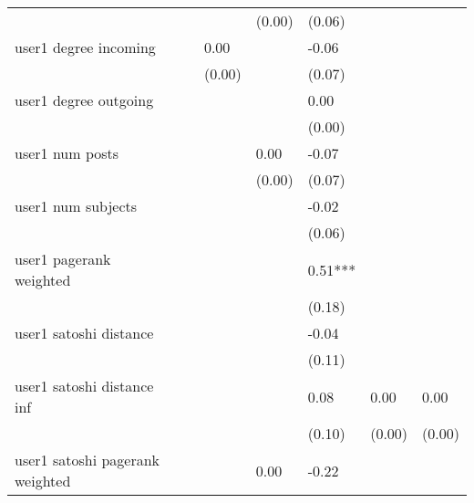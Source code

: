 \begin{table}
\begin{center}
\begin{tabular}{llllllll}
                                               &         &         &         & (0.00)  & (0.06)   &           &          \\
user1 degree incoming                          &         &         & 0.00    &         & -0.06    &           &          \\
                                               &         &         & (0.00)  &         & (0.07)   &           &          \\
user1 degree outgoing                          &         &         &         &         & 0.00     &           &          \\
                                               &         &         &         &         & (0.00)   &           &          \\
user1 num posts                                &         &         &         & 0.00    & -0.07    &           &          \\
                                               &         &         &         & (0.00)  & (0.07)   &           &          \\
user1 num subjects                             &         &         &         &         & -0.02    &           &          \\
                                               &         &         &         &         & (0.06)   &           &          \\
user1 pagerank weighted                        &         &         &         &         & 0.51***  &           &          \\
                                               &         &         &         &         & (0.18)   &           &          \\
user1 satoshi distance                         &         &         &         &         & -0.04    &           &          \\
                                               &         &         &         &         & (0.11)   &           &          \\
user1 satoshi distance inf                     &         &         &         &         & 0.08     & 0.00      & 0.00     \\
                                               &         &         &         &         & (0.10)   & (0.00)    & (0.00)   \\
user1 satoshi pagerank weighted                &         &         &         & 0.00    & -0.22    &           &          \\

\end{tabular}
\end{center}
\end{table}

